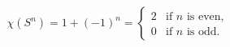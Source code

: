 $$
\chi(S^{n}) = 1 + (-1)^{n} = \begin{cases}
2 & \text{if } n \text{ is even}, \\
0 & \text{if } n \text{ is odd}.
\end{cases}
$$
